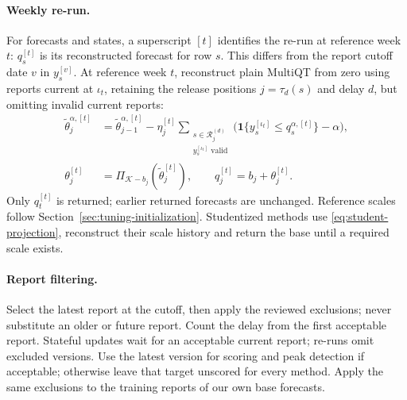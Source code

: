 \documentclass[11pt,a4paper]{article}
\newcommand{\K}{\mathcal{K}}
\newcommand{\ind}{\mathbf{1}}
\theoremstyle{definition}
\theoremstyle{remark}
\begin{document}
\paragraph{Weekly re-run.}
For forecasts and states, a superscript $[t]$ identifies the re-run at
reference week $t$: $q_s^{[t]}$ is its reconstructed forecast for row $s$.
This differs from the report cutoff date $v$ in $y_s^{[v]}$.
At reference week $t$, reconstruct plain MultiQT from zero using reports
current at $\iota_t$, retaining the release positions $j=\tau_d(s)$ and
delay $d$, but omitting invalid current reports:
\begin{align}
 \tilde\theta_j^{\alpha,[t]}
 &=\tilde\theta_{j-1}^{\alpha,[t]}-\eta_j^{[t]}
   \sum_{\substack{s\in\mathcal R_j^{(d)}\\y_s^{[\iota_t]}\text{ valid}}}
   \bigl(\ind\{y_s^{[\iota_t]}\le q_s^{\alpha,[t]}\}-\alpha\bigr),
 \label{eq:rerun-standard-update}\\
 \theta_j^{[t]}&=\Pi_{\K-b_j}(\tilde\theta_j^{[t]}),\qquad
 q_j^{[t]}=b_j+\theta_j^{[t]}.
 \label{eq:rerun-standard-forecast}
\end{align}
Only $q_t^{[t]}$ is returned; earlier returned forecasts are unchanged.
Reference scales follow Section~\ref{sec:tuning-initialization}.
Studentized methods use
\eqref{eq:student-projection}, reconstruct their scale history and return
the base until a required scale exists.

\paragraph{Report filtering.}
Select the latest report at the cutoff, then apply the reviewed exclusions;
never substitute an older or future report. Count the delay from the first
acceptable report. Stateful updates wait for an acceptable current report;
re-runs omit excluded versions. Use the latest version for scoring and
peak detection if acceptable; otherwise leave
that target unscored for every method. Apply the same exclusions to
the training reports of our own base forecasts.
\end{document}

